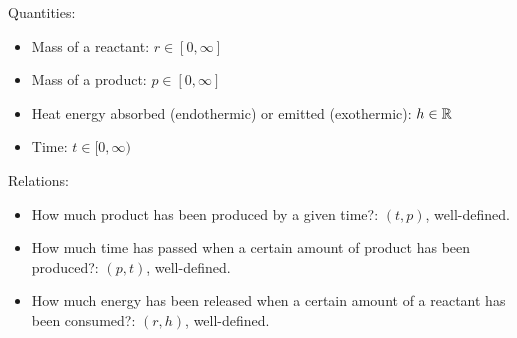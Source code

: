 \documentclass[letterpaper,12pt,fleqn]{article}
\begin{document}
\begin{example}
  Quantities:

  \begin{itemize}
  \item Mass of a reactant: \(r\in[0,\infty]\)
  \item Mass of a product: \(p\in[0,\infty]\)
  \item Heat energy absorbed (endothermic) or emitted (exothermic): \(h\in\mathbb{R}\)
  \item Time: \(t\in[0,\infty)\)
  \end{itemize}

  Relations:

  \begin{itemize}
  \item How much product has been produced by a given time?: \((t,p)\), well-defined.
  \item How much time has passed when a certain amount of product has been produced?: \((p,t)\), well-defined.
  \item How much energy has been released when a certain amount of a reactant has been consumed?: \((r,h)\),
    well-defined.
  \end{itemize}

  \begin{center}
  \end{center}
\end{example}

\newpage
\end{document}
